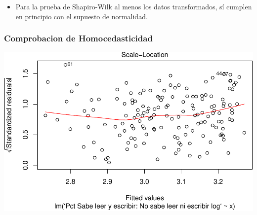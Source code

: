 \documentclass[11pt,]{article}
\newenvironment{Shaded}{\begin{snugshade}}{\end{snugshade}}
\newcommand{\KeywordTok}[1]{\textcolor[rgb]{0.13,0.29,0.53}{\textbf{#1}}}
\newcommand{\DataTypeTok}[1]{\textcolor[rgb]{0.13,0.29,0.53}{#1}}
\newcommand{\DecValTok}[1]{\textcolor[rgb]{0.00,0.00,0.81}{#1}}
\newcommand{\StringTok}[1]{\textcolor[rgb]{0.31,0.60,0.02}{#1}}
\newcommand{\OperatorTok}[1]{\textcolor[rgb]{0.81,0.36,0.00}{\textbf{#1}}}
\newcommand{\NormalTok}[1]{#1}
\providecommand{\tightlist}{%
\setlength{\itemsep}{0pt}\setlength{\parskip}{0pt}}
\begin{document}
\begin{itemize}
\tightlist
\item
  Para la prueba de Shapiro-Wilk al menos los datos transformados, sí
  cumplen en principio con el supuesto de normalidad.
\end{itemize}

\subsubsection{Comprobacion de
Homocedasticidad}\label{comprobacion-de-homocedasticidad-1}

\begin{Shaded}
\end{Shaded}

\includegraphics{proyecto_files/figure-latex/unnamed-chunk-9-1.pdf}

\begin{Shaded}
\end{Shaded}
\end{document}

